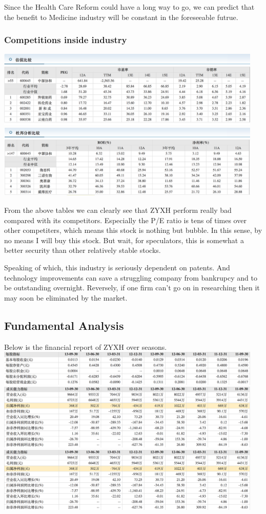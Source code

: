 \documentclass{article}
\begin{document}
Since the Health Care Reform could have a long way to go, we can predict that the benefit to Medicine industry will be constant in the foreseeable futrue. 

\subsubsection{Competitions inside industry}
\includegraphics[width=5in]{value_compare} 
\includegraphics[width=5in]{dubang} 

From the above tables we can clearly see that ZYXH perform really bad compared with its competitors. Especially the P/E ratio is tens of times over other competiters, which means this stock is nothing but bubble.
In this sense, by no means I will buy this stock. But wait, for speculators, this is somewhat a better security than other relatively stable stocks.

Speaking of which, this industry is seriously dependent on patents. And technology improvements can save a struggling company from bankrupcy and to be outstanding overnight. Reversely, if one firm can't go on in researching then it may soon be eliminated by the market.

\subsection{Fundamental Analysis}
Below is the financial report of ZYXH over seasons.\\
\includegraphics[width=5in]{report1} 
\includegraphics[width=5in]{report2} 
\includegraphics[width=5in]{report2}
\end{document}
